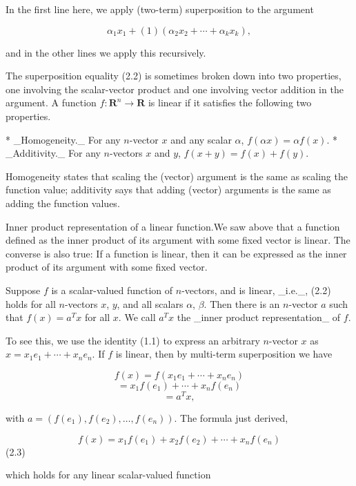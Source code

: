 In the first line here, we apply (two-term) superposition to the argument

\[\alpha_{1}x_{1}+(1)(\alpha_{2}x_{2}+\cdots+\alpha_{k}x_{k}),\]

and in the other lines we apply this recursively.

The superposition equality (2.2) is sometimes broken down into two properties, one involving the scalar-vector product and one involving vector addition in the argument. A function \(f:\mathbf{R}^{n}\rightarrow\mathbf{R}\) is linear if it satisfies the following two properties.

* _Homogeneity._ For any \(n\)-vector \(x\) and any scalar \(\alpha\), \(f(\alpha x)=\alpha f(x)\).
* _Additivity._ For any \(n\)-vectors \(x\) and \(y\), \(f(x+y)=f(x)+f(y)\).

Homogeneity states that scaling the (vector) argument is the same as scaling the function value; additivity says that adding (vector) arguments is the same as adding the function values.

Inner product representation of a linear function.We saw above that a function defined as the inner product of its argument with some fixed vector is linear. The converse is also true: If a function is linear, then it can be expressed as the inner product of its argument with some fixed vector.

Suppose \(f\) is a scalar-valued function of \(n\)-vectors, and is linear, _i.e._, (2.2) holds for all \(n\)-vectors \(x\), \(y\), and all scalars \(\alpha\), \(\beta\). Then there is an \(n\)-vector \(a\) such that \(f(x)=a^{T}x\) for all \(x\). We call \(a^{T}x\) the _inner product representation_ of \(f\).

To see this, we use the identity (1.1) to express an arbitrary \(n\)-vector \(x\) as \(x=x_{1}e_{1}+\cdots+x_{n}e_{n}\). If \(f\) is linear, then by multi-term superposition we have

\[f(x) = f(x_{1}e_{1}+\cdots+x_{n}e_{n})\] \[= x_{1}f(e_{1})+\cdots+x_{n}f(e_{n})\] \[= a^{T}x,\]

with \(a=(f(e_{1}),f(e_{2}),\ldots,f(e_{n}))\). The formula just derived,

\[f(x)=x_{1}f(e_{1})+x_{2}f(e_{2})+\cdots+x_{n}f(e_{n})\] (2.3)

which holds for any linear scalar-valued function 